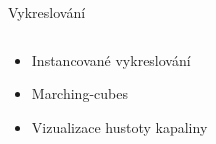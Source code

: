 \documentclass[10pt,xcolor=pdflatex,hyperref={unicode},aspectratio=169]{beamer}
\begin{document}

\begin{frame}{Vykreslování}

    \begin{columns}
        \hspace{.4cm}
        \begin{column}{0.5\textwidth}
            \begin{itemize}
                \item Instancované vykreslování
                \bigbreak
                \item Marching-cubes
                \bigbreak
                \item Vizualizace hustoty kapaliny
            \end{itemize}
        \end{column}
            \begin{column}{0.5\textwidth}
            \begin{center}
            \end{center}
        \end{column}
    \end{columns}
    
    \begin{columns}
        \hspace{.4cm}
        \begin{column}{0.5\textwidth}
            \begin{center}
            \end{center}
        \end{column}
        \begin{column}{0.5\textwidth}
            \begin{center}
            \end{center}
        \end{column}
    \end{columns}
    
\end{frame}

\end{document}
